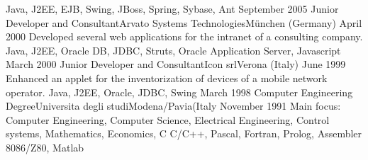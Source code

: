 \begin{experiences}
                    {Java, J2EE, EJB, Swing, JBoss, Spring, Sybase, Ant}
  \emptySeparator
  \consultantexperience
  {September 2005}   {Junior Developer and Consultant}{Arvato Systems Technologies}{München (Germany)}
  {April 2000}       {
                     	  Developed several web applications for the intranet of a consulting company.
                     }
                     {Java, J2EE, Oracle DB, JDBC, Struts, Oracle Application Server, Javascript}
  \emptySeparator
  \consultantexperience
  {March 2000}  	{Junior Developer and Consultant}{Icon srl}{Verona (Italy)}
  {June 1999}   	{ 
  				 		Enhanced an applet for the inventorization of devices of a mobile network operator.
  				 	}
                	{Java, J2EE, Oracle, JDBC, Swing} 
   \emptySeparator
  \consultantexperience
  {March 1998}  	{Computer Engineering Degree}{Universita degli studi}{Modena/Pavia(Italy}
  {November 1991}   	{Main focus: Computer Engineering, Computer Science, Electrical Engineering, Control systems, Mathematics, Economics, C}
                	{C/C++, Pascal, Fortran, Prolog, Assembler 8086/Z80, Matlab}   
\end{experiences}

